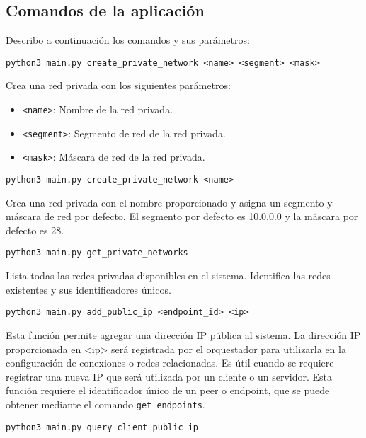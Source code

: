 \subsection*{Comandos de la aplicación}
Describo a continuación los comandos y sus parámetros: 
    \begin{Verbatim}[breaklines=true]
    python3 main.py create_private_network <name> <segment> <mask>
    \end{Verbatim}
    Crea una red privada con los siguientes parámetros:
    \begin{itemize}
        \item \texttt{<name>}: Nombre de la red privada.
        \item \texttt{<segment>}: Segmento de red de la red privada.
        \item \texttt{<mask>}: Máscara de red de la red privada.
    \end{itemize}

    \begin{Verbatim}[breaklines=true]
    python3 main.py create_private_network <name>
    \end{Verbatim}
    Crea una red privada con el nombre proporcionado y asigna un segmento y máscara de red por defecto.
    El segmento por defecto es 10.0.0.0 y la máscara por defecto es 28.

    \begin{Verbatim}[breaklines=true]
    python3 main.py get_private_networks
    \end{Verbatim}
    Lista todas las redes privadas disponibles en el sistema. Identifica las redes existentes y sus identificadores únicos.

    \begin{Verbatim}[breaklines=true]
    python3 main.py add_public_ip <endpoint_id> <ip>
\end{Verbatim}

    Esta función permite agregar una dirección IP pública al sistema. La dirección IP proporcionada en <ip> será registrada por el orquestador para utilizarla en la configuración de conexiones o redes relacionadas. Es útil cuando se requiere registrar una nueva IP que será utilizada por un cliente o un servidor.
    Esta función requiere el identificador único de un peer o endpoint, que se puede obtener mediante el comando \texttt{get\_endpoints}.

    
    \begin{Verbatim}[breaklines=true]
    python3 main.py query_client_public_ip
    \end{Verbatim}

